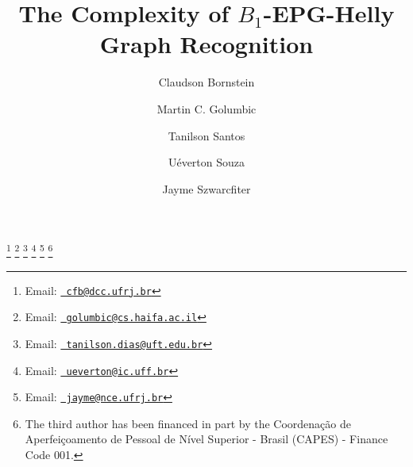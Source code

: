 \documentclass[9pt]{entcs}
\begin{document}
\begin{frontmatter}
  \title{The Complexity of $B_{1}$-EPG-Helly Graph Recognition} 
  
  \author{Claudson Bornstein}
  \address{Institute of Mathematics\\ Federal University of Rio de Janeiro\\
    Rio de Janeiro-RJ, Brazil} \author{Martin C. Golumbic}
  \address{Caesarea Rothschild Institute and  Department of Computer Science\\University of Haifa\\
    Haifa, Israel}
    \author{Tanilson Santos}
  \address{Computer Science Course\\Federal University of Tocantins\\
    Palmas-TO, Brazil}
    \address{COPPE/PESC\\ Federal University of Rio de Janeiro\\
    Rio de Janeiro-RJ, Brazil}
    \author{U\'everton Souza}
  \address{Institute of Computation\\Fluminense Federal University\\
    Niter\'oi-RJ, Brazil}
    \author{Jayme Szwarcfiter}
  \address{Institute of Mathematics\\State University of Rio de Janeiro\\
    Rio de Janeiro-RJ, Brazil}
    \address{COPPE/PESC and Institute of Mathematics/UFRJ\\ Federal University of Rio de Janeiro\\
    Rio de Janeiro-RJ, Brazil}
     \thanks[myemail]{Email:
    \href{mailto:cbornstein@gmail.com} {\texttt{\normalshape
        cfb@dcc.ufrj.br}}}
    \thanks[myemail2]{Email:
    \href{mailto:golumbic@cs.haifa.ac.il} {\texttt{\normalshape
        golumbic@cs.haifa.ac.il}}}    
    \thanks[myemail3]{Email:
    \href{mailto:tanilson.dias@uft.edu.br} {\texttt{\normalshape
        tanilson.dias@uft.edu.br}}}       
    \thanks[myemail4]{Email:
    \href{mailto:ueverton@ic.uff.br} {\texttt{\normalshape
        ueverton@ic.uff.br}}}            
    \thanks[coemail]{Email:
    \href{mailto:jayme@nce.ufrj.br} {\texttt{\normalshape
        jayme@nce.ufrj.br}}}
    \thanks[ALL]{The third author has been financed in part by the Coordena{\c c}\~ao de Aperfei{\c c}oamento de Pessoal de N\'ivel Superior - Brasil (CAPES) - Finance Code 001.}    
    




\end{frontmatter}
\end{document}
